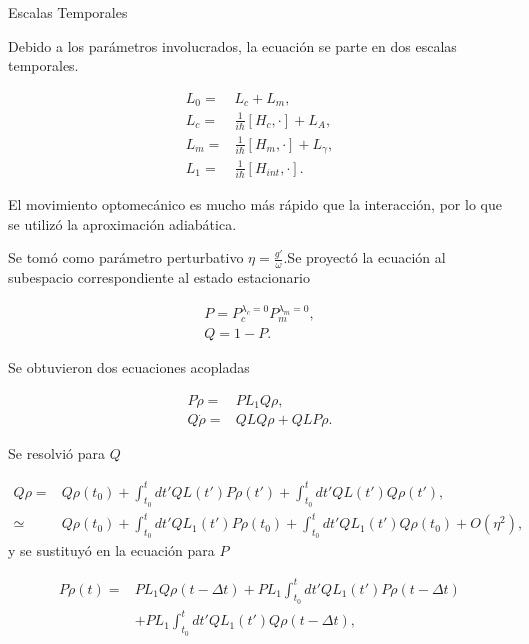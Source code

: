 \documentclass[10pt]{beamer}
\begin{document}
\begin{frame}{Escalas Temporales}

Debido a los parámetros involucrados, la ecuación se parte en dos escalas temporales. 

\begin{align*}
L_0 =& L_c + L_m,\\
L_c =& \frac{1}{i\hbar}[H_c,\cdot] + L_A,\\
L_m =& \frac{1}{i\hbar}[H_m,\cdot] + L_\gamma,\\
L_1 =& \frac{1}{i\hbar}[H_{int},\cdot].
\end{align*}

El movimiento optomecánico es mucho más rápido que la interacción, por lo que se utilizó la aproximación adiabática.


\end{frame}

\begin{frame}
Se tomó como parámetro perturbativo $\eta=\frac{g'}{\omega}$.Se proyectó la ecuación al subespacio correspondiente al estado estacionario

\begin{align*}
P = P_c^{\lambda_c = 0}P_m^{\lambda_m = 0},\\
Q = 1 - P.
\end{align*}

Se obtuvieron dos ecuaciones acopladas

\begin{align*}
P\dot{\rho}=& PL_1Q\rho, \\
Q\dot{\rho}=& QLQ\rho + QLP\rho.
\end{align*}
\end{frame}

\begin{frame}
Se resolvió para $Q$

\begin{align*}
Q\rho =& Q\rho(t_0) + \int_{t_0}^{t}dt' QL(t')P\rho(t')+\int_{t_0}^{t}dt'QL(t')Q\rho(t'),\\
\simeq & Q\rho(t_0) + \int_{t_0}^{t}dt' QL_1(t')P\rho(t_0)+\int_{t_0}^{t}dt'QL_1(t')Q\rho(t_0)+O(\eta^2),
\end{align*} y se sustituyó en la ecuación para $P$

\begin{align*}
P\dot{\rho}(t) =& PL_1Q\rho(t-\Delta t) + PL_1\int_{t_0}^{t}dt' QL_1(t')P\rho(t-\Delta t)\\
 &+ PL_1\int_{t_0}^{t}dt'QL_1(t')Q\rho(t-\Delta t),
\end{align*} 

\end{frame}
\end{document}
